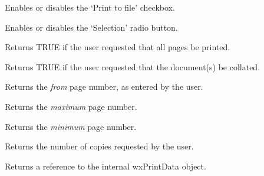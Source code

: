 Enables or disables the `Print to file' checkbox.

\label{wxprintdialogdataenableselection}


Enables or disables the `Selection' radio button.

\label{wxprintdialogdatagetallpages}


Returns TRUE if the user requested that all pages be printed.

\label{wxprintdialogdatagetcollate}


Returns TRUE if the user requested that the document(s) be collated.

\label{wxprintdialogdatagetfrompage}


Returns the {\it from} page number, as entered by the user.

\label{wxprintdialogdatagetmaxpage}


Returns the {\it maximum} page number.

\label{wxprintdialogdatagetminpage}


Returns the {\it minimum} page number.

\label{wxprintdialogdatagetnocopies}


Returns the number of copies requested by the user.

\label{wxprintdialogdatagetprintdata}


Returns a reference to the internal wxPrintData object.

\label{wxprintdialogdatagetprinttofile}

